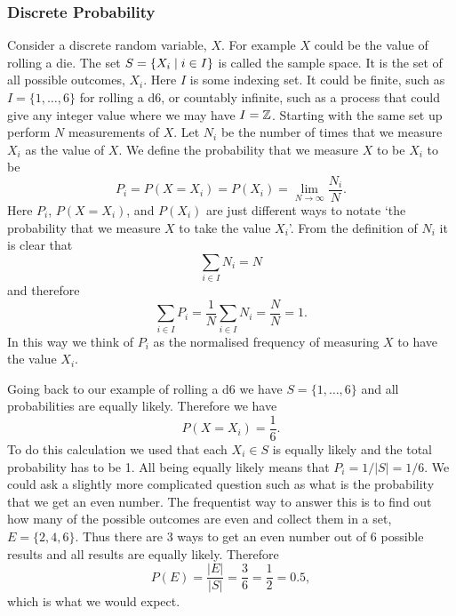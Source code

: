     \subsubsection{Discrete Probability}
    Consider a discrete random variable, \(X\).
    For example \(X\) could be the value of rolling a die.
    The set \(S = \{X_i\mid i\in I\}\) is called the sample space.
    It is the set of all possible outcomes, \(X_i\).
    Here \(I\) is some indexing set.
    It could be finite, such as \(I = \{1, \dotsc, 6\}\) for rolling a d6, or countably infinite, such as a process that could give any integer value where we may have \(I = \mathbb{Z}\).
    Starting with the same set up perform \(N\) measurements of \(X\).
    Let \(N_i\) be the number of times that we measure \(X_i\) as the value of \(X\).
    We define the probability that we measure \(X\) to be \(X_i\) to be 
    \[P_i = P(X = X_i) = P(X_i) = \lim_{N\to\infty} \frac{N_i}{N}.\]
    Here \(P_i\), \(P(X = X_i)\), and \(P(X_i)\) are just different ways to notate `the probability that we measure \(X\) to take the value \(X_i\)'.
    From the definition of \(N_i\) it is clear that
    \[\sum_{i\in I} N_i = N\]
    and therefore
    \[\sum_{i\in I} P_i = \frac{1}{N}\sum_{i\in I}N_i = \frac{N}{N} = 1.\]
    In this way we think of \(P_i\) as the normalised frequency of measuring \(X\) to have the value \(X_i\).
    
    Going back to our example of rolling a d6 we have \(S = \{1, \dotsc, 6\}\) and all probabilities are equally likely.
    Therefore we have
    \[P(X = X_i) = \frac{1}{6}.\]
    To do this calculation we used that each \(X_i\in S\) is equally likely and the total probability has to be 1.
    All being equally likely means that \(P_i = 1/|S| = 1/6\).
    We could ask a slightly more complicated question such as what is the probability that we get an even number.
    The frequentist way to answer this is to find out how many of the possible outcomes are even and collect them in a set, \(E = \{2, 4, 6\}\).
    Thus there are 3 ways to get an even number out of 6 possible results and all results are equally likely.
    Therefore
    \[P(E) = \frac{|E|}{|S|} = \frac{3}{6} = \frac{1}{2} = 0.5,\]
    which is what we would expect.
    
